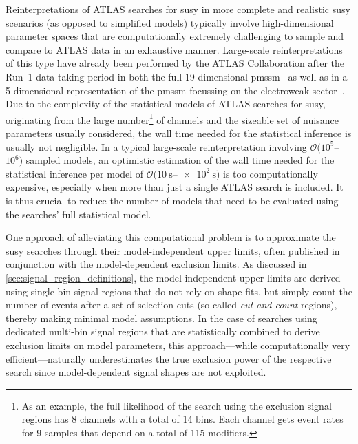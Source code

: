 Reinterpretations of ATLAS searches for \gls{susy} in more complete and realistic \gls{susy} scenarios (as opposed to simplified models) typically involve high-dimensional parameter spaces that are computationally extremely challenging to sample and compare to ATLAS data in an exhaustive manner.
Large-scale reinterpretations of this type have already been performed by the ATLAS Collaboration after the Run~1 data-taking period in both the full 19-dimensional \gls{pmssm}~\cite{pMSSM-scan-run1:2015baa} as well as in a 5-dimensional representation of the \gls{pmssm} focussing on the electroweak sector~\cite{Aaboud:2016wna}.
Due to the complexity of the statistical models of ATLAS searches for \gls{susy}, originating from the large number\footnote{As an example, the full likelihood of the \onelepton search using the exclusion signal regions has 8 channels with a total of 14 bins. Each channel gets event rates for 9 samples that depend on a total of 115 modifiers.} of channels and the sizeable set of nuisance parameters usually considered, the wall time needed for the statistical inference is usually not negligible.
In a typical large-scale reinterpretation involving \mbox{$\mathcal{O}(10^5$--$10^6)$} sampled models, an optimistic estimation of the wall time needed for the statistical inference per model of \mbox{$\mathcal{O}(\SI{10}{\second}$--$\SI{e2}{\second})$} is too computationally expensive, especially when more than just a single ATLAS search is included.
It is thus crucial to reduce the number of models that need to be evaluated using the searches' full statistical model.

One approach of alleviating this computational problem is to approximate the \gls{susy} searches through their model-independent upper limits, often published in conjunction with the model-dependent exclusion limits.
As discussed in \cref{sec:signal_region_definitions}, the model-independent upper limits are derived using single-bin signal regions that do not rely on shape-fits, but simply count the number of events after a set of selection cuts (so-called \textit{cut-and-count} regions), thereby making minimal model assumptions.
In the case of searches using dedicated multi-bin signal regions that are statistically combined to derive exclusion limits on model parameters, this approach---while computationally very efficient---naturally underestimates the true exclusion power of the respective search since model-dependent signal shapes are not exploited.

